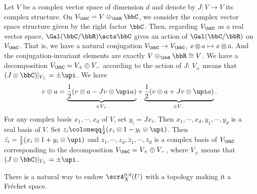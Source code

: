 \begin{example}[label=\labelNFM{eg:complex-vector-space-with-conjugation}, status=draft, tag=0000000]
	Let $V$ be a complex vector space of dimension $d$ and denote by $J:V \to V$ its complex structure.
	On $V_\bbC = V \otimes _\bbR \bbC$, we consider the complex vector space structure given by the right factor $\bbC$.
	Then, regarding $V_\bbC$ as a real vector space, $\Gal(\bbC/\bbR) \acts \bbC$ gives an action of $\Gal(\bbC/\bbR)$ on $V_\bbC$.
	That is, we have a natural conjugation $V_\bbC \to V_\bbC$, $x \otimes a \mapsto x \otimes \bar{a}$.
	And the conjugation-invariant elements are exactly $V \otimes _\bbR \bbR \cong V$.
	We have a decomposition $V_\bbC = V_+ \oplus V_-$ according to the action of $J$: $V_\pm$ means that $(J \otimes \bbC)|_{V_{\pm}} = \pm \upi$.
	We have
	\[ v \otimes a = \underbrace{\frac{1}{2}(v \otimes a - Jv \otimes \upi a)}_{ \in V_+} + \underbrace{\frac{1}{2}(v \otimes a + Jv \otimes \upi a)}_{ \in V_-}. \]
	For any complex basis $x_1,\cdots,x_d$ of $V$, set $y_i = Jx_i$.
	Then $x_1,\cdots,x_d,y_1,\cdots,y_d$ is a real basis of $V$.
	Set $z_i \coloneqq \frac{1}{2}(x_i \otimes 1 - y_i \otimes \upi)$.
	Then $\bar{z_i} = \frac{1}{2}(x_i \otimes 1 + y_i \otimes \upi)$ and $z_1,\cdots,z_d,\bar{z}_1,\cdots,\bar{z}_d$ is a complex basis of $V_\bbC$ corresponding to the decomposition $V_\bbC = V_+ \oplus V_-$,
	where $V_\pm$ means that $(J \otimes \bbC)|_{V_{\pm}} = \pm \upi$.
\end{example}


There is a natural way to endow $\scrA_X^{p,q}(U)$ with a topology making it a Fr\'echet space.

